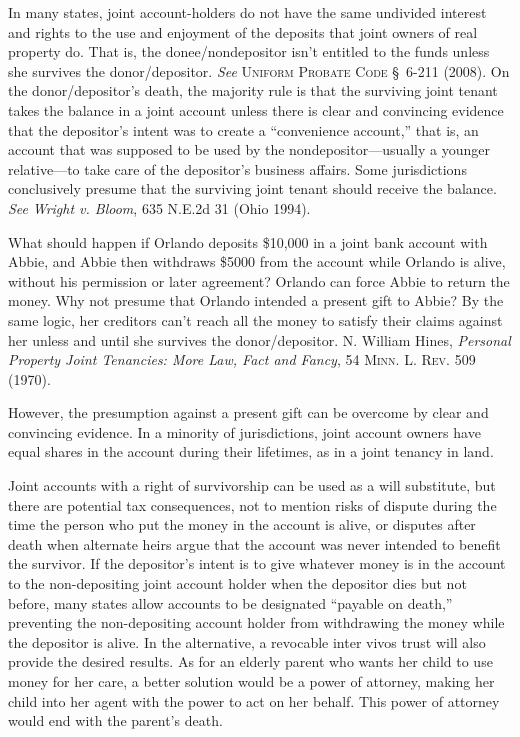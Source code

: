 In many states, joint account-holders do not have the same undivided interest
and rights to the use and enjoyment of the deposits that joint owners of real
property do. That is, the donee/nondepositor isn't entitled to the funds
unless she survives the donor/depositor. \emph{See} \textsc{Uniform Probate
Code} \S~6-211
(2008). On the donor/depositor's death, the majority rule is that the
surviving joint tenant takes the balance in a joint account unless there is
clear and convincing evidence that the depositor's intent was to create a
``convenience account,'' that is, an account that was supposed to be used by
the nondepositor---usually a younger relative---to take care of the
depositor's business affairs. Some jurisdictions conclusively presume that the
surviving joint tenant should receive the balance. \emph{See} \emph{Wright v.
Bloom}, 635 N.E.2d 31 (Ohio 1994).



What should happen if Orlando deposits \$10,000 in a joint bank account with
Abbie, and Abbie then withdraws \$5000 from the account while Orlando is alive,
without his permission or later agreement? Orlando can force Abbie to return
the money. Why not presume that Orlando intended a present gift to Abbie? By
the same logic, her creditors can't reach all the money to satisfy their claims
against her unless and until she survives the donor/depositor. N. William
Hines, \emph{Personal Property Joint Tenancies: More Law, Fact and Fancy}, 54
\textsc{Minn. L. Rev.} 509 (1970).



However, the presumption against a present gift can be overcome by clear and
convincing evidence. In a minority of jurisdictions, joint account owners have
equal shares in the account during their lifetimes, as in a joint tenancy in
land.



Joint accounts with a right of survivorship can be used as a will substitute,
but there are potential tax consequences, not to mention risks of dispute
during the time the person who put the money in the account is alive, or
disputes after death when alternate heirs argue that the account was never
intended to benefit the survivor. If the depositor's intent is to give
whatever money is in the account to the non-depositing joint account holder
when the depositor dies but not before, many states allow accounts to be
designated ``payable on death,'' preventing the non-depositing account holder
from withdrawing the money while the depositor is alive. In the alternative, a
revocable inter vivos trust will also provide the desired results. As for an
elderly parent who wants her child to use money for her care, a better solution
would be a power of attorney, making her child into her agent with the power to
act on her behalf. This power of attorney would end with the parent's death.



